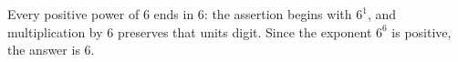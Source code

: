 Every positive power of 6 ends in 6: the assertion begins with $6^1$, and multiplication by 6 preserves that units digit. Since the exponent $6^6$ is positive, the answer is $\boxed6$.
